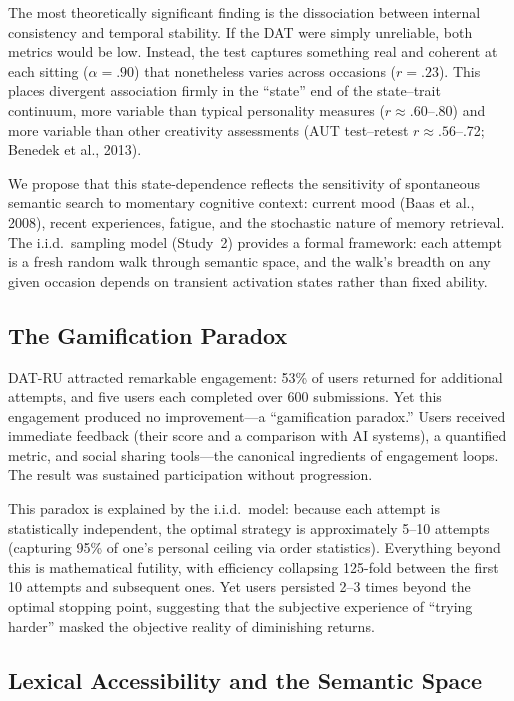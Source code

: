 \documentclass[12pt]{article}
\begin{document}
The most theoretically significant finding is the dissociation between internal consistency and temporal stability. If the DAT were simply unreliable, both metrics would be low. Instead, the test captures something real and coherent at each sitting ($\alpha = .90$) that nonetheless varies across occasions ($r = .23$). This places divergent association firmly in the ``state'' end of the state--trait continuum, more variable than typical personality measures ($r \approx .60$--.80) and more variable than other creativity assessments (AUT test--retest $r \approx .56$--.72; Benedek et al., 2013).

We propose that this state-dependence reflects the sensitivity of spontaneous semantic search to momentary cognitive context: current mood (Baas et al., 2008), recent experiences, fatigue, and the stochastic nature of memory retrieval. The i.i.d.\ sampling model (Study~2) provides a formal framework: each attempt is a fresh random walk through semantic space, and the walk's breadth on any given occasion depends on transient activation states rather than fixed ability.

\subsection{The Gamification Paradox}

DAT-RU attracted remarkable engagement: 53\% of users returned for additional attempts, and five users each completed over 600 submissions. Yet this engagement produced no improvement---a ``gamification paradox.'' Users received immediate feedback (their score and a comparison with AI systems), a quantified metric, and social sharing tools---the canonical ingredients of engagement loops. The result was sustained participation without progression.

This paradox is explained by the i.i.d.\ model: because each attempt is statistically independent, the optimal strategy is approximately 5--10 attempts (capturing 95\% of one's personal ceiling via order statistics). Everything beyond this is mathematical futility, with efficiency collapsing 125-fold between the first 10 attempts and subsequent ones. Yet users persisted 2--3 times beyond the optimal stopping point, suggesting that the subjective experience of ``trying harder'' masked the objective reality of diminishing returns.

\subsection{Lexical Accessibility and the Semantic Space}
\end{document}
